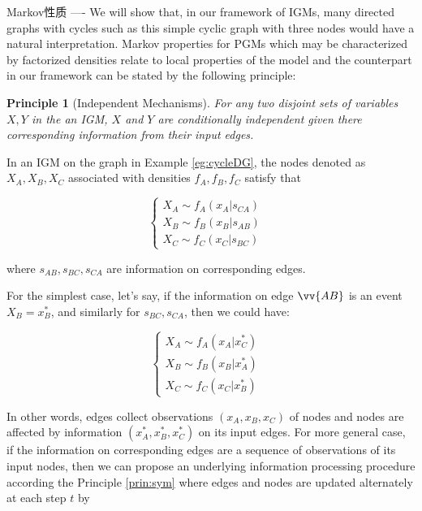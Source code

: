 \documentclass[10pt,onecolumn,letterpaper]{article}
\newtheorem{principle}[theorem]{Principle}
\begin{document}
\begin{CJK*}{UTF8}{gbsn}
Markov性质 ----
We will show that, in our framework of IGMs, many directed graphs with cycles such as this simple cyclic graph with three nodes would have a natural interpretation. Markov properties for PGMs which may be characterized by factorized densities relate to local properties of the model and the counterpart in our framework can be stated by the following principle:

\begin{principle}[Independent Mechanisms]
    For any two disjoint sets of variables $X, Y$ in the an IGM, $X$ and $Y$ are conditionally independent given there corresponding information from their input edges.
\end{principle}

In an IGM on the graph in Example \ref{eg:cycleDG}, the nodes denoted as $X_A, X_B, X_C$ associated with densities $f_A, f_B, f_C$ satisfy that 

\begin{equation} \label{eq:1}
\left\{
     \begin{array}{lr}
     X_A \sim f_A(x_A|s_{CA}) &  \\
     X_B \sim f_B(x_B|s_{AB}) & \\
     X_C \sim f_C(x_C|s_{BC}) &  
     \end{array}
\right.
\end{equation}

where $s_{AB}, s_{BC}, s_{CA}$ are information on corresponding edges.

For the simplest case, let's say, if the information on edge $\vv{AB}$ is an event $X_B=x_B^*$, and similarly for $s_{BC}, s_{CA}$, then we could have:

\begin{equation}
\left\{
     \begin{array}{lr}
     X_A \sim f_A(x_A|x_{C}^*) &  \\
     X_B \sim f_B(x_B|x_{A}^*) & \\
     X_C \sim f_C(x_C|x_{B}^*) &  
     \end{array}
\right.
\end{equation}

In other words, edges collect observations $(x_A, x_B, x_C)$ of nodes and nodes are affected by information $(x_A^*, x_B^*, x_C^*)$ on its input edges. For more general case, if the information on corresponding edges are a sequence of observations of its input nodes, then we can propose an underlying information processing procedure according the Principle \ref{prin:sym} where edges and nodes are updated alternately at each step $t$ by


\end{CJK*}
\end{document}
